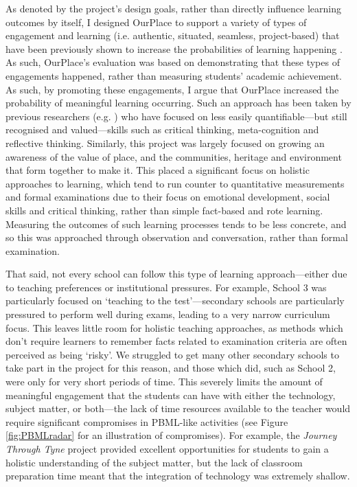 As denoted by the project's design goals, rather than directly influence learning outcomes by itself, I designed OurPlace to support a variety of types of engagement and learning (i.e. authentic, situated, seamless, project-based) that have been previously shown to increase the probabilities of learning happening \citep{Frohberg2009, Sharples2013, Blumenfeld1991}. As such, OurPlace's evaluation was based on demonstrating that these types of engagements happened, rather than measuring students' academic achievement. As such, by promoting these engagements, I argue that OurPlace increased the probability of meaningful learning occurring. Such an approach has been taken by previous researchers (e.g. \cite{kharrufa2010thesis}) who have focused on less easily quantifiable---but still recognised and valued---skills such as critical thinking, meta-cognition and reflective thinking. Similarly, this project was largely focused on growing an awareness of the value of place, and the communities, heritage and environment that form together to make it. This placed a significant focus on holistic approaches to learning, which tend to run counter to quantitative measurements and formal examinations due to their focus on emotional development, social skills and critical thinking, rather than simple fact-based and rote learning. Measuring the outcomes of such learning processes tends to be less concrete, and so this was approached through observation and conversation, rather than formal examination.

That said, not every school can follow this type of learning approach---either due to teaching preferences or institutional pressures. For example, School 3 was particularly focused on `teaching to the test'---secondary schools are particularly pressured to perform well during exams, leading to a very narrow curriculum focus. This leaves little room for holistic teaching approaches, as methods which don't require learners to remember facts related to examination criteria are often perceived as being `risky'. We struggled to get many other secondary schools to take part in the project for this reason, and those which did, such as School 2, were only for very short periods of time. This severely limits the amount of meaningful engagement that the students can have with either the technology, subject matter, or both---the lack of time resources available to the teacher would require significant compromises in PBML-like activities (see Figure \ref{fig:PBMLradar} for an illustration of compromises). For example, the \textit{Journey Through Tyne} project provided excellent opportunities for students to gain a holistic understanding of the subject matter, but the lack of classroom preparation time meant that the integration of technology was extremely shallow.

